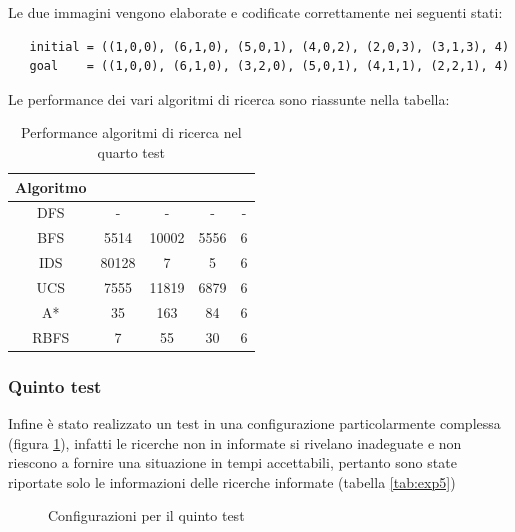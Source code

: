 \documentclass{article}
\begin{document}
	\noindent Le due immagini vengono elaborate e codificate correttamente nei seguenti stati:
	\begin{verbatim}
   initial = ((1,0,0), (6,1,0), (5,0,1), (4,0,2), (2,0,3), (3,1,3), 4)
   goal    = ((1,0,0), (6,1,0), (3,2,0), (5,0,1), (4,1,1), (2,2,1), 4)
	\end{verbatim}
	Le performance dei vari algoritmi di ricerca sono riassunte nella tabella:
	\begin{table}[H]
		\centering
		\def\arraystretch{1.5}
		\begin{tabular}{|c|c|c|c|c|}
			\hline
			\textbf{Algoritmo} & \bm{$n$} & \bm{$m$} & \bm{$\mu$} & \bm{$l$} \\
			\hline
			DFS & - & - & - & - \\
			\hline
			BFS & 5514 & 10002 & 5556 & 6 \\
			\hline
			IDS &  80128 & 7 & 5 & 6 \\
			\hline
			UCS &  7555 & 11819 & 6879 & 6 \\
			\hline
			A* &  35 & 163 & 84 & 6 \\
			\hline
			RBFS & 7 & 55 & 30 & 6 \\
			\hline
			
		\end{tabular}
		\caption{Performance algoritmi di ricerca nel quarto test}
		\label{tab:exp4}
	\end{table}


	\subsubsection{Quinto test}
	Infine è stato realizzato un test in una configurazione particolarmente complessa (figura \ref{fig:exp5}), infatti le ricerche non in informate si rivelano inadeguate e non riescono a fornire una situazione in tempi accettabili, pertanto sono state riportate solo le informazioni delle ricerche informate (tabella \ref{tab:exp5}) 
	\begin{figure}[H]
		\centering
		\protect\caption{Configurazioni per il quinto test}
		\label{fig:exp5}
	\end{figure}
	
\end{document}
